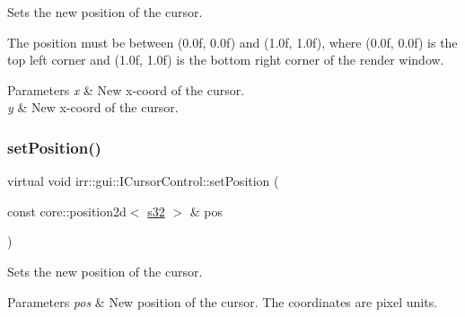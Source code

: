 Sets the new position of the cursor. 

The position must be between (0.\+0f, 0.\+0f) and (1.\+0f, 1.\+0f), where (0.\+0f, 0.\+0f) is the top left corner and (1.\+0f, 1.\+0f) is the bottom right corner of the render window. 
\begin{DoxyParams}{Parameters}
{\em x} & New x-\/coord of the cursor. \\
\hline
{\em y} & New x-\/coord of the cursor. \\
\hline
\end{DoxyParams}
\mbox{\label{classirr_1_1gui_1_1ICursorControl_a421c770ffc494f8f6082a16bef0feed2}} 
\subsubsection{\texorpdfstring{set\+Position()}{setPosition()}\hspace{0.1cm}{\footnotesize\ttfamily [3/4]}}
{\footnotesize\ttfamily virtual void irr\+::gui\+::\+I\+Cursor\+Control\+::set\+Position (\begin{DoxyParamCaption}\item[{const core\+::position2d$<$ \hyperlink{namespaceirr_ac66849b7a6ed16e30ebede579f9b47c6}{s32} $>$ \&}]{pos }\end{DoxyParamCaption})\hspace{0.3cm}{\ttfamily [pure virtual]}}



Sets the new position of the cursor. 


\begin{DoxyParams}{Parameters}
{\em pos} & New position of the cursor. The coordinates are pixel units. \\
\hline
\end{DoxyParams}
\mbox{\label{classirr_1_1gui_1_1ICursorControl_a3b0a59608d1d0810079349acfa01a79b}} 
